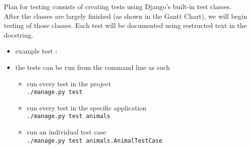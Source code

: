\documentclass[12pt]{article}
\begin{document}
	\begin{description}
\item Plan for testing consists of creating tests using Django's built-in test classes. After the classes are largely finished (as shown in the Gantt Chart), we will begin testing of those classes. Each test will be documented using restructed text in the docstring.
		\begin {itemize}
\item example test :
%

\item the tests can be run from the command line as such
			\begin{itemize}
\item run every test in the project 
\\
\verb+./manage.py test+
\item run every test in the specific application
\\
\verb+./manage.py test animals+
\item run an individual test case
\\
\verb+./manage.py test animals.AnimalTestCase+
			\end {itemize}
	\end {itemize}
	\end{description}
\end{document}

